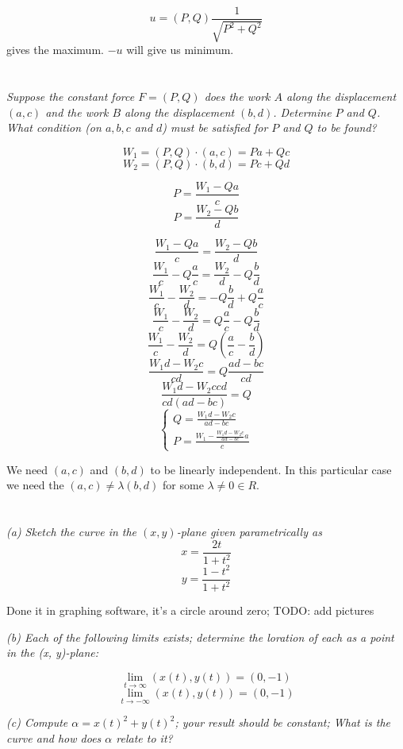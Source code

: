 \documentclass[11pt,oneside,titlepage]{book}
\begin{document}
$$u = (P, Q) \frac{1}{\sqrt{P^2 + Q^2}}$$
gives the maximum. $-u$ will give us minimum.

\section{}

\textit{Suppose the constant force $F = (P, Q)$ does the work $A$ along the displacement
  $(a, c)$ and the work $B$ along the displacement $(b, d)$. Determine $P$ and $Q$. What
  condition (on $a, b, c$ and $d$) must be satisfied for $P$ and $Q$ to be found?}

$$W_1 = (P, Q) \cdot (a, c) = Pa + Qc$$
$$W_2 = (P, Q) \cdot (b, d) = Pc + Qd$$

$$P = \frac{W_1 - Qa}{c}$$
$$P = \frac{W_2 - Qb}{d}$$

$$\frac{W_1 - Qa}{c} = \frac{W_2 - Qb}{d}$$
$$\frac{W_1}{c} - Q \frac{a}{ c} = \frac{W_2}{d} - Q\frac{b}{d}$$
$$\frac{W_1}{c} - \frac{W_2}{d}  =  - Q\frac{b}{d} + Q \frac{a}{ c}$$
$$\frac{W_1}{c} - \frac{W_2}{d}  =   Q \frac{a}{ c} - Q\frac{b}{d} $$
$$\frac{W_1}{c} - \frac{W_2}{d}  =   Q \left( \frac{a}{ c} - \frac{b}{d} \right) $$
$$\frac{W_1 d - W_2 c}{cd}  =   Q  \frac{ad - bc }{ cd} $$
$$\frac{W_1 d - W_2 c cd}{cd (ad - bc)}  =   Q   $$
$$
\begin{cases}
  Q = \frac{W_1 d - W_2 c }{ad - bc} \\
  P = \frac{W_1 - \frac{W_1 d - W_2 c }{ad - bc} a}{c}
\end{cases}
$$

We need $(a, c)$ and $(b, d)$ to be linearly independent. In this particular case we need
the $(a, c) \neq \lambda (b, d)$ for some $\lambda \neq 0 \in R$.


\section{}

\textit{(a) Sketch the curve in the $(x, y)$-plane given parametrically as }
$$x = \frac{2t}{1 + t^2}$$
$$y = \frac{1 - t^2}{1 + t^2}$$

Done it in graphing software, it's a circle around zero; TODO: add pictures

\textit{(b) Each of the following limits exists; determine the loration of each as a
  point in the (x, y)-plane: }

$$\lim_{t \to \infty}{(x(t), y(t))} = (0, -1)$$
$$\lim_{t \to -\infty}{(x(t), y(t))} = (0, -1)$$

\textit{(c) Compute $\alpha = x(t)^2 + y(t)^2$; your result should be constant; What is the curve
  and how does $\alpha$ relate to it?}
\end{document}
